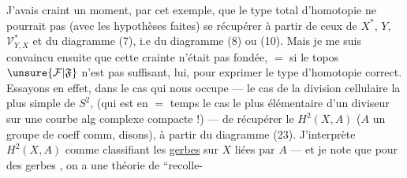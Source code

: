J'avais craint un moment, par cet exemple,
que le type total d'homotopie  ne pourrait
pas (avec les hypothèses  faites) se récupérer
à partir de ceux de $X^*$, $Y$, $\mathcal V^*_{Y,X}$ et du
diagramme (7), i.e du diagramme (8)
ou (10). Mais je me suis convaincu ensuite
que cette crainte n'était pas fondée, $=$ si
le topos $\unsure{\mathcal F|\mathfrak F}$ n'est pas suffisant, lui, pour
exprimer le type d'homotopie correct.
Essayons en effet, dans le cas qui nous
occupe --- le cas de la division cellulaire
la plus simple de $S^2$, (qui est en $=$ temps
le cas le plus  élémentaire d'un
diviseur sur une courbe alg complexe
compacte !) --- de récupérer le $H^2(X,A)$
($A$ un groupe de coeff comm, disons),
à partir du diagramme (23). J'interprète
$H^2(X,A)$ comme classifiant les \uline{gerbes} sur
$X$ liées par $A$ --- et je note que pour des
 gerbes , on a une théorie de ``recolle-
